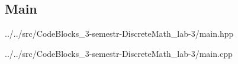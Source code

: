 \newpage

\subsection{Main}


{../../src/CodeBlocks_3-semestr-DiscreteMath_lab-3/main.hpp}


{../../src/CodeBlocks_3-semestr-DiscreteMath_lab-3/main.cpp}

\newpage

% 